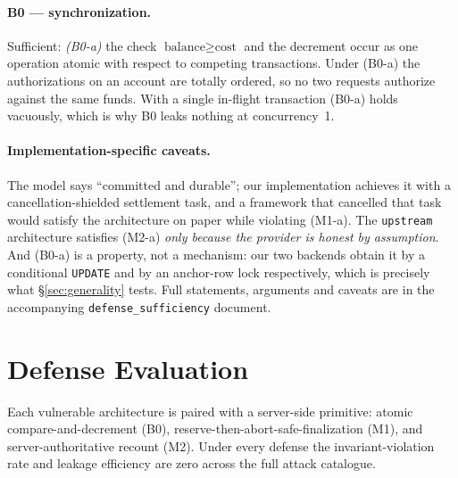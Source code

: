 \documentclass[11pt]{article}
\begin{document}
\paragraph{B0 --- synchronization.} Sufficient: \emph{(B0-a)} the check
$\text{balance}\ge\text{cost}$ and the decrement occur as one operation atomic with
respect to competing transactions. Under (B0-a) the authorizations on an account are
totally ordered, so no two requests authorize against the same funds. With a single
in-flight transaction (B0-a) holds vacuously, which is why B0 leaks nothing at
concurrency~1.

\paragraph{Implementation-specific caveats.} The model says ``committed and durable''; our
implementation achieves it with a cancellation-shielded settlement task, and a framework
that cancelled that task would satisfy the architecture on paper while violating (M1-a).
The \texttt{upstream} architecture satisfies (M2-a) \emph{only because the provider is
honest by assumption}. And (B0-a) is a property, not a mechanism: our two backends obtain
it by a conditional \texttt{UPDATE} and by an anchor-row lock respectively, which is
precisely what \S\ref{sec:generality} tests. Full statements, arguments and caveats are in
the accompanying \texttt{defense\_sufficiency} document.

\section{Defense Evaluation}
Each vulnerable architecture is paired with a server-side primitive: atomic
compare-and-decrement (B0), reserve-then-abort-safe-finalization (M1), and
server-authoritative recount (M2). Under every defense the invariant-violation rate and
leakage efficiency are zero across the full attack catalogue.
\end{document}
